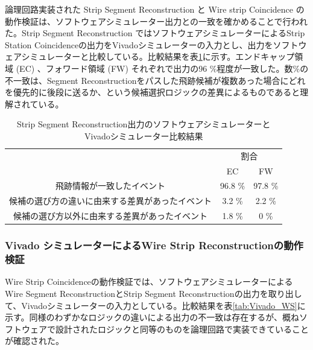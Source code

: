論理回路実装された Strip Segment Reconstruction と Wire strip Coincidence の動作検証は、ソフトウェアシミュレーター出力との一致を確かめることで行われた。Strip Segment Reconstruction ではソフトウェアシミュレーターによるStrip Station Coincidenceの出力をVivadoシミュレーターの入力とし、出力をソフトウェアシミュレーターと比較している。比較結果を表\ref{tab:Vivado_strip}に示す。エンドキャップ領域 (EC) 、フォワード領域 (FW) それぞれで出力の96 \%程度が一致した。数\%の不一致は、Segment Reconstructionをパスした飛跡候補が複数あった場合にどれを優先的に後段に送るか、という候補選択ロジックの差異によるものであると理解されている。

\begin{table}[]
    \centering
    \caption{Strip Segment Reconstruction出力のソフトウェアシミュレーターとVivadoシミュレーター比較結果}
    \label{tab:Vivado_strip}
    \begin{tabular}{|c|cc|}
    \hline
    \multirow{2}{*}{}        & \multicolumn{2}{c|}{割合}                \\ \cline{2-3} 
                             & \multicolumn{1}{c|}{EC}      & FW      \\ \hline\hline
    飛跡情報が一致したイベント            & \multicolumn{1}{c|}{96.8 \%} & 97.8 \% \\ \hline
    候補の選び方の違いに由来する差異があったイベント & \multicolumn{1}{c|}{3.2 \%}  & 2.2 \%  \\ \hline
    候補の選び方以外に由来する差異があったイベント  & \multicolumn{1}{c|}{1.8 \%}  & 0 \%    \\ \hline
    \end{tabular}
\end{table}



\subsubsection*{Vivado シミュレーターによるWire Strip Reconstructionの動作検証}
Wire Strip Coincidenceの動作検証では、ソフトウェアシミュレーターによるWire Segment ReconstructionとStrip Segment Reconstructionの出力を取り出して、Vivadoシミュレーターの入力としている。比較結果を表\ref{tab:Vivado_WS}に示す。同様のわずかなロジックの違いによる出力の不一致は存在するが、概ねソフトウェアで設計されたロジックと同等のものを論理回路で実装できていることが確認された。

